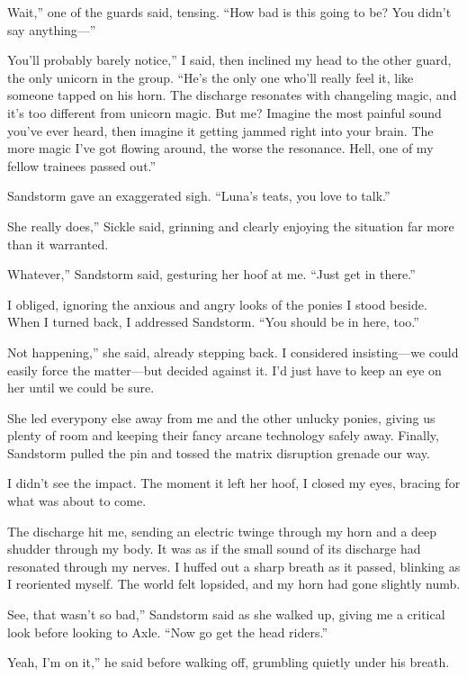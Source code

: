 \leavevmode{}Wait,” one of the guards said, tensing. “How bad is this going to be? You didn’t say anything—”

\leavevmode{}You’ll probably barely notice,” I said, then inclined my head to the other guard, the only unicorn in the group. “He’s the only one who’ll really feel it, like someone tapped on his horn. The discharge resonates with changeling magic, and it’s too different from unicorn magic. But me? Imagine the most painful sound you’ve ever heard, then imagine it getting jammed right into your brain. The more magic I’ve got flowing around, the worse the resonance. Hell, one of my fellow trainees passed out.”

Sandstorm gave an exaggerated sigh. “Luna’s teats, you love to talk.”

\leavevmode{}She really does,” Sickle said, grinning and clearly enjoying the situation far more than it warranted.

\leavevmode{}Whatever,” Sandstorm said, gesturing her hoof at me. “Just get in there.”

I obliged, ignoring the anxious and angry looks of the ponies I stood beside. When I turned back, I addressed Sandstorm. “You should be in here, too.”

\leavevmode{}Not happening,” she said, already stepping back. I considered insisting—we could easily force the matter—but decided against it. I’d just have to keep an eye on her until we could be sure.

She led everypony else away from me and the other unlucky ponies, giving us plenty of room and keeping their fancy arcane technology safely away. Finally, Sandstorm pulled the pin and tossed the matrix disruption grenade our way.

I didn’t see the impact. The moment it left her hoof, I closed my eyes, bracing for what was about to come.

The discharge hit me, sending an electric twinge through my horn and a deep shudder through my body. It was as if the small sound of its discharge had resonated through my nerves. I huffed out a sharp breath as it passed, blinking as I reoriented myself. The world felt lopsided, and my horn had gone slightly numb.

\leavevmode{}See, that wasn’t so bad,” Sandstorm said as she walked up, giving me a critical look before looking to Axle. “Now go get the head riders.”

\leavevmode{}Yeah, I’m on it,” he said before walking off, grumbling quietly under his breath.

